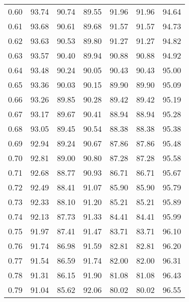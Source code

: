 \begin{tabular}{|c|c|c|c|c|c|c|}
      0.60 &     93.74 &     90.74 &      89.55 &   91.96 &      91.96 &         94.64 \\
      0.61 &     93.68 &     90.61 &      89.68 &   91.57 &      91.57 &         94.73 \\
      0.62 &     93.63 &     90.53 &      89.80 &   91.27 &      91.27 &         94.82 \\
      0.63 &     93.57 &     90.40 &      89.94 &   90.88 &      90.88 &         94.92 \\
      0.64 &     93.48 &     90.24 &      90.05 &   90.43 &      90.43 &         95.00 \\
      0.65 &     93.36 &     90.03 &      90.15 &   89.90 &      89.90 &         95.09 \\
      0.66 &     93.26 &     89.85 &      90.28 &   89.42 &      89.42 &         95.19 \\
      0.67 &     93.17 &     89.67 &      90.41 &   88.94 &      88.94 &         95.28 \\
      0.68 &     93.05 &     89.45 &      90.54 &   88.38 &      88.38 &         95.38 \\
      0.69 &     92.94 &     89.24 &      90.67 &   87.86 &      87.86 &         95.48 \\
      0.70 &     92.81 &     89.00 &      90.80 &   87.28 &      87.28 &         95.58 \\
      0.71 &     92.68 &     88.77 &      90.93 &   86.71 &      86.71 &         95.67 \\
      0.72 &     92.49 &     88.41 &      91.07 &   85.90 &      85.90 &         95.79 \\
      0.73 &     92.33 &     88.10 &      91.20 &   85.21 &      85.21 &         95.89 \\
      0.74 &     92.13 &     87.73 &      91.33 &   84.41 &      84.41 &         95.99 \\
      0.75 &     91.97 &     87.41 &      91.47 &   83.71 &      83.71 &         96.10 \\
      0.76 &     91.74 &     86.98 &      91.59 &   82.81 &      82.81 &         96.20 \\
      0.77 &     91.54 &     86.59 &      91.74 &   82.00 &      82.00 &         96.31 \\
      0.78 &     91.31 &     86.15 &      91.90 &   81.08 &      81.08 &         96.43 \\
      0.79 &     91.04 &     85.62 &      92.06 &   80.02 &      80.02 &         96.55 \\

\end{tabular}

